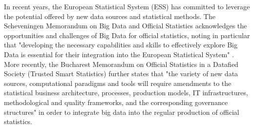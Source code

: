 In recent years, the European Statistical System (ESS) has committed to leverage the potential offered
by new data sources and statistical methods. The Scheveningen Memorandum on Big Data and Official Statistics
acknowledges the opportunities and challenges of Big Data for official statistics,
noting in particular that "developing the necessary capabilities and skills to effectively explore
Big Data is essential for their integration into the European Statistical System" \cite{scheveningen2013}.
More recently, the Bucharest Memorandum on Official Statistics in a Datafied Society (Trusted Smart Statistics)
\cite{bucharest2018} further states that "the variety of new data sources, computational paradigms and tools
will require amendments to the statistical business architecture, processes, production models, IT
infrastructures, methodological and quality frameworks, and the corresponding governance structures" in order
to integrate big data into the regular production of official statistics.

